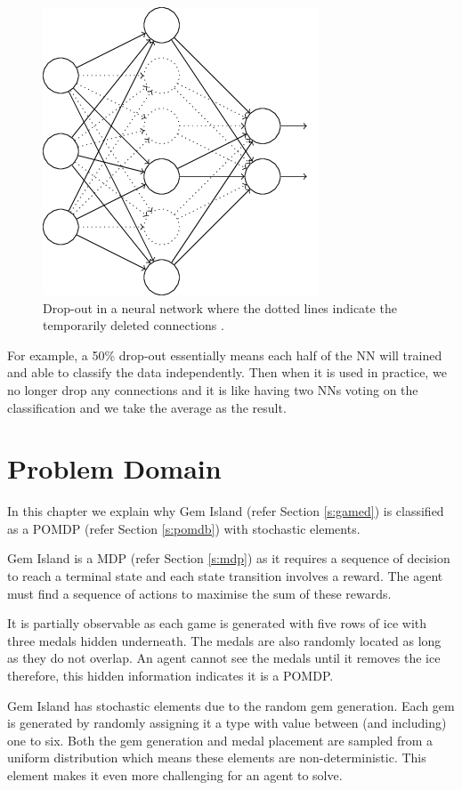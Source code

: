 \documentclass{bhamthesis}
\theoremstyle{definition}
\begin{document}
\begin{figure}
	\centering
	\includegraphics[width=.4\textwidth]{media/img/nnDropout}
	\caption{Drop-out in a neural network where the dotted lines indicate the temporarily deleted connections \cite{Neilsen2015}.}\label{f:nnDropout}
\end{figure}

For example, a 50\% drop-out essentially means each half of the NN will trained and able to classify the data independently. Then when it is used in practice, we no longer drop any connections and it is like having two NNs voting on the classification and we take the average as the result.



\chapter{Problem Domain}\label{ch:pb}
In this chapter we explain why Gem Island (refer Section \ref{s:gamed}) is classified as a POMDP (refer Section \ref{s:pomdb}) with stochastic elements.

Gem Island is a MDP (refer Section \ref{s:mdp}) as it requires a sequence of decision to reach a terminal state and each state transition involves a reward. The agent must find a sequence of actions to maximise the sum of these rewards. 

It is partially observable as each game is generated with five rows of ice with three medals hidden underneath. The medals are also randomly located as long as they do not overlap. An agent cannot see the medals until it removes the ice therefore, this hidden information indicates it is a POMDP.

Gem Island has stochastic elements due to the random gem generation. Each gem is generated by randomly assigning it a type with value between (and including) one to six. Both the gem generation and medal placement are sampled from a uniform distribution which means these elements are non-deterministic. This element makes it even more challenging for an agent to solve.
\end{document}
